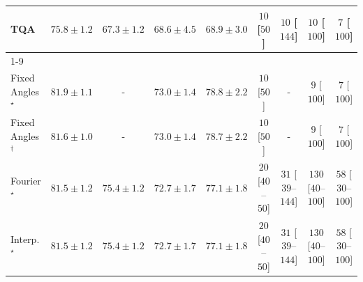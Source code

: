 \begin{tabular}{l|cccc|cccc|}
TQA & {\cellcolor[HTML]{ED7215}} \color[HTML]{F1F1F1} $75.8\pm 1.2$ & {\cellcolor[HTML]{FFF9C7}} \color[HTML]{000000} $67.3\pm 1.2$ & {\cellcolor[HTML]{FFEFAC}} \color[HTML]{000000} $68.6\pm 4.5$ & {\cellcolor[HTML]{FEEDA6}} \color[HTML]{000000} $68.9\pm 3.0$ & {\cellcolor[HTML]{FFF7F3}} \color[HTML]{000000} $10$ [$50$] & {\cellcolor[HTML]{FFF7F3}} \color[HTML]{000000} $10$ [$144$] & {\cellcolor[HTML]{FFF7F3}} \color[HTML]{000000} $10$ [$100$] & {\cellcolor[HTML]{FFF7F3}} \color[HTML]{000000} $7$ [$100$] \\
\cline{1-9}
\multicolumn{9}{c}{\rule{0pt}{8pt}PP} \\
\midrule
Fixed Angles$^\star$ & {\cellcolor[HTML]{004629}} \color[HTML]{F1F1F1} $81.9\pm 1.1$ & {\cellcolor[HTML]{000000}} \color[HTML]{F1F1F1} {\cellcolor{white}} \color{black} - & {\cellcolor[HTML]{90D083}} \color[HTML]{000000} $73.0\pm 1.4$ & {\cellcolor[HTML]{14783E}} \color[HTML]{F1F1F1} $78.8\pm 2.2$ & {\cellcolor[HTML]{FFF7F3}} \color[HTML]{000000} $10$ [$50$] & {\cellcolor[HTML]{000000}} \color[HTML]{F1F1F1} {\cellcolor{white}} \color{black} - & {\cellcolor[HTML]{FFF7F3}} \color[HTML]{000000} $9$ [$100$] & {\cellcolor[HTML]{FFF7F3}} \color[HTML]{000000} $7$ [$100$] \\
Fixed Angles$^\dagger$ & {\cellcolor[HTML]{004C2C}} \color[HTML]{F1F1F1} $81.6\pm 1.0$ & {\cellcolor[HTML]{000000}} \color[HTML]{F1F1F1} {\cellcolor{white}} \color{black} - & {\cellcolor[HTML]{90D083}} \color[HTML]{000000} $73.0\pm 1.4$ & {\cellcolor[HTML]{167A3F}} \color[HTML]{F1F1F1} $78.7\pm 2.2$ & {\cellcolor[HTML]{FFF7F3}} \color[HTML]{000000} $10$ [$50$] & {\cellcolor[HTML]{000000}} \color[HTML]{F1F1F1} {\cellcolor{white}} \color{black} - & {\cellcolor[HTML]{FFF7F3}} \color[HTML]{000000} $9$ [$100$] & {\cellcolor[HTML]{FFF7F3}} \color[HTML]{000000} $7$ [$100$] \\
Fourier$^\star$ & {\cellcolor[HTML]{004D2C}} \color[HTML]{F1F1F1} $81.5\pm 1.2$ & {\cellcolor[HTML]{4FB264}} \color[HTML]{F1F1F1} $75.4\pm 1.2$ & {\cellcolor[HTML]{97D385}} \color[HTML]{000000} $72.7\pm 1.7$ & {\cellcolor[HTML]{2F944E}} \color[HTML]{F1F1F1} $77.1\pm 1.8$ & {\cellcolor[HTML]{FFF4F0}} \color[HTML]{000000} $20$ [$40$--$50$] & {\cellcolor[HTML]{FFF2EE}} \color[HTML]{000000} $31$ [$39$--$144$] & {\cellcolor[HTML]{FDDBD7}} \color[HTML]{000000} $130$ [$40$--$100$] & {\cellcolor[HTML]{FEECE9}} \color[HTML]{000000} $58$ [$30$--$100$] \\
Interp.$^\star$ & {\cellcolor[HTML]{004D2C}} \color[HTML]{F1F1F1} $81.5\pm 1.2$ & {\cellcolor[HTML]{4FB264}} \color[HTML]{F1F1F1} $75.4\pm 1.2$ & {\cellcolor[HTML]{97D385}} \color[HTML]{000000} $72.7\pm 1.7$ & {\cellcolor[HTML]{2F944E}} \color[HTML]{F1F1F1} $77.1\pm 1.8$ & {\cellcolor[HTML]{FFF4F0}} \color[HTML]{000000} $20$ [$40$--$50$] & {\cellcolor[HTML]{FFF2EE}} \color[HTML]{000000} $31$ [$39$--$144$] & {\cellcolor[HTML]{FDDBD7}} \color[HTML]{000000} $130$ [$40$--$100$] & {\cellcolor[HTML]{FEECE9}} \color[HTML]{000000} $58$ [$30$--$100$] \\

\end{tabular}
